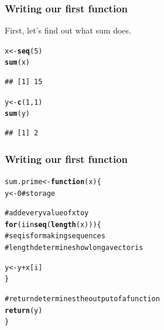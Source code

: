 \documentclass{beamer}\usepackage{graphicx, color}
\makeatletter
\newcommand{\hlfunctioncall}[1]{\textcolor[rgb]{0.501960784313725,0,0.329411764705882}{\textbf{#1}}}%
\newcommand{\hlcomment}[1]{\textcolor[rgb]{0.180392156862745,0.6,0.341176470588235}{#1}}%
\newenvironment{kframe}{%
 \def\at@end@of@kframe{}%
 \ifinner\ifhmode%
  \def\at@end@of@kframe{\end{minipage}}%
  \begin{minipage}{\columnwidth}%
 \fi\fi%
 \def\FrameCommand##1{\hskip\@totalleftmargin \hskip-\fboxsep
 \colorbox{shadecolor}{##1}\hskip-\fboxsep
     \hskip-\linewidth \hskip-\@totalleftmargin \hskip\columnwidth}%
 \MakeFramed {\advance\hsize-\width
   \@totalleftmargin\z@ \linewidth\hsize
   \@setminipage}}%
 {\par\unskip\endMakeFramed%
 \at@end@of@kframe}
\newenvironment{knitrout}{}{} %
\makeatother
\begin{document}
\begin{frame}[fragile]
  \frametitle{Writing our first function}

  First, let's find out what sum does.

\begin{knitrout}\small
{}\color{fgcolor}\begin{kframe}
\begin{alltt}
x <- \hlfunctioncall{seq}(5)
\hlfunctioncall{sum}(x)
\end{alltt}
\begin{verbatim}
## [1] 15
\end{verbatim}
\begin{alltt}

y <- \hlfunctioncall{c}(1, 1)
\hlfunctioncall{sum}(y)
\end{alltt}
\begin{verbatim}
## [1] 2
\end{verbatim}
\end{kframe}
\end{knitrout}


\end{frame}

\begin{frame}[fragile]
  \frametitle{Writing our first function}

\begin{knitrout}\small
{}\color{fgcolor}\begin{kframe}
\begin{alltt}
sum.prime <- \hlfunctioncall{function}(x) \{
  y <- 0  \hlcomment{# storage}

\hlcomment{  # add every value of x to y}
  \hlfunctioncall{for}(i in \hlfunctioncall{seq}(\hlfunctioncall{length}(x))) \{  
\hlcomment{    # seq is for making sequences }
\hlcomment{    # length determines how long a vector is}
    
    y <- y + x[i]
  \}

\hlcomment{  # return determines the output of a function}
  \hlfunctioncall{return}(y)
\}
\end{alltt}
\end{kframe}
\end{knitrout}


\end{frame}
\end{document}
